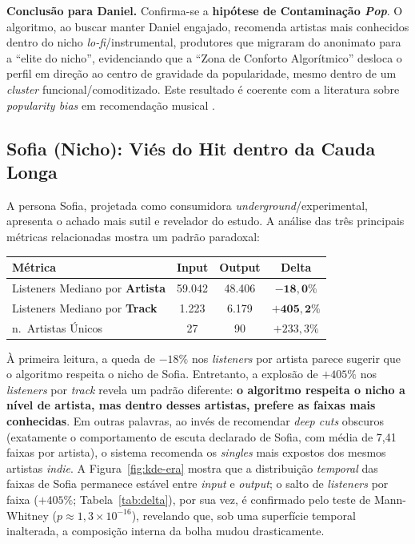 \documentclass[12pt, %
openright,
oneside, %
a4paper,    %
english,   %
brazil]{facom-ufu-abntex2}
\begin{document}
\textbf{Conclusão para Daniel.} Confirma-se a \textbf{hipótese de Contaminação
\emph{Pop}}. O algoritmo, ao buscar manter Daniel engajado, recomenda artistas
mais conhecidos dentro do nicho \emph{lo-fi}/instrumental, produtores que
migraram do anonimato para a ``elite do nicho'', evidenciando que a ``Zona de
Conforto Algorítmico'' desloca o perfil em direção ao centro de gravidade da
popularidade, mesmo dentro de um \emph{cluster} funcional/comoditizado. Este
resultado é coerente com a literatura sobre \emph{popularity bias} em recomendação
musical \cite{bauer2019global,kowald2020unfairness}.

\subsection{Sofia (Nicho): Viés do Hit dentro da Cauda Longa}

A persona Sofia, projetada como consumidora \emph{underground}/experimental,
apresenta o achado mais sutil e revelador do estudo. A análise das três principais
métricas relacionadas mostra um padrão paradoxal:

\begin{center}
\footnotesize
\begin{tabular}{l c c c}
\toprule
\textbf{Métrica} & \textbf{Input} & \textbf{Output} & \textbf{Delta} \\
\midrule
Listeners Mediano por \textbf{Artista} & 59.042 & 48.406 & $\mathbf{-18{,}0\%}$ \\
Listeners Mediano por \textbf{Track}   & 1.223  & 6.179  & $\mathbf{+405{,}2\%}$ \\
n.\ Artistas Únicos                    & 27     & 90     & $+233{,}3\%$ \\
\bottomrule
\end{tabular}
\end{center}

À primeira leitura, a queda de $-18\%$ nos \emph{listeners} por artista parece
sugerir que o algoritmo respeita o nicho de Sofia. Entretanto, a explosão de
$+405\%$ nos \emph{listeners} por \emph{track} revela um padrão diferente:
\textbf{o algoritmo respeita o nicho a nível de artista, mas dentro desses
artistas, prefere as faixas mais conhecidas}. Em outras palavras, ao invés de
recomendar \emph{deep cuts} obscuros (exatamente o comportamento de escuta
declarado de Sofia, com média de 7,41 faixas por artista), o sistema recomenda os
\emph{singles} mais expostos dos mesmos artistas \emph{indie}. A
Figura~\ref{fig:kde-era} mostra que a distribuição \emph{temporal} das faixas de
Sofia permanece estável entre \emph{input} e \emph{output}; o salto de
\emph{listeners} por faixa ($+405\%$; Tabela~\ref{tab:delta}), por sua vez, é
confirmado pelo teste de Mann-Whitney ($p \approx 1{,}3 \times 10^{-16}$),
revelando que, sob uma superfície temporal inalterada, a composição interna da
bolha mudou drasticamente.
\end{document}
